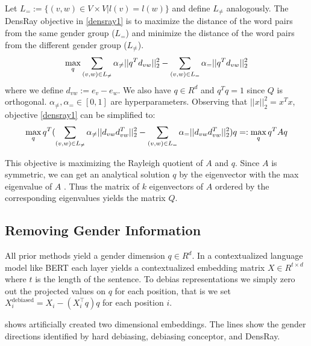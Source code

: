 Let $L_{=}:=\{(v,w)\in V\times V|l(v)=l(w)\}$ and define
$L_{\neq}$ analogously.  The DensRay objective
in \eqref{densray1} is to maximize the distance of the word
pairs from the same gender group ($L_{=}$) and minimize the
distance of the word pairs from the different gender group
($L_{\neq}$).
\begin{eqnarray}
\max\limits_{q} 
\sum_{(v,w)\in L_{\neq}}\alpha_{\neq}||q^Td_{vw}||^2_2
-\sum_{(v,w)\in L_{=}}\alpha_{=}||q^Td_{vw}||^2_2
\eqlabel{densray1}
\end{eqnarray}
where we define $d_{vw}:=e_v-e_w$. We also have $q\in R^d$
and $q^Tq=1$ since $Q$ is orthogonal. $\alpha_{\neq},\alpha_{=}\in [0,1]$ are hyperparameters. Observing that $||x||^2_2=x^Tx$, objective \eqref{densray1} can be simplified to:
\begin{eqnarray}
\max \limits_{q} q^T(
\sum_{(v,w)\in L_{\neq}}\alpha_{\neq}||d_{vw}d_{vw}^T||^2_2-\sum_{(v,w)\in L_{=}}\alpha_{=}||d_{vw}d_{vw}^T||^2_2)q=:\max\limits_{q} q^TAq
\eqlabel{eq:densray2}
\end{eqnarray}

This objective is maximizing the Rayleigh quotient of $A$ and $q$. Since $A$ is symmetric, we can get an analytical solution $q$ by the eigenvector with the max eigenvalue of $A$ \cite{horn1990matrix}. Thus the matrix of $k$ eigenvectors of $A$ ordered by the corresponding eigenvalues yields the matrix $Q$.
\subsection{Removing Gender Information}

All prior methods yield a gender dimension $q \in R^d$. In a contextualized language model like BERT each layer yields a contextualized embedding matrix $X \in R^{t \times d}$ where $t$ is the length of the sentence. To debias representations we simply zero out the projected values on $q$ for each position, that is we set $X^{\text{debiased}}_i = X_i -  (X_i^\intercal q) q$ for each position $i$.

  shows artificially created two dimensional embeddings. The lines show the gender directions identified by hard debiasing, debiasing conceptor, and DensRay. 
 
